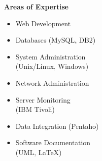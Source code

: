 \begin{minipage}[t]{.35\linewidth}
\vspace{0pt}
\textbf{Areas of Expertise}
\begin{itemize}[itemsep=0pt]
    \item Web Development
    \item Databases (MySQL, DB2)
    \item System Administration \\ (Unix/Linux, Windows)
    \item Network Administration
    \item Server Monitoring \\ (IBM Tivoli)
    \item Data Integration (Pentaho)
    \item Software Documentation \\ (UML, LaTeX)
\end{itemize}
\end{minipage}